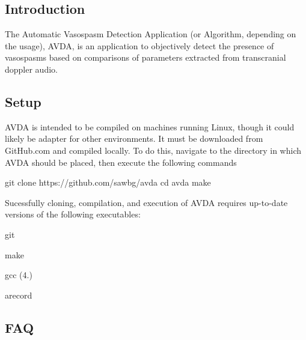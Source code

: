 \subsection*{Introduction}

The Automatic Vasospasm Detection Application (or Algorithm, depending on the usage), A\+V\+D\+A, is an application to objectively detect the presence of vasospasms based on comparisons of parameters extracted from transcranial doppler audio.

\subsection*{Setup}

A\+V\+D\+A is intended to be compiled on machines running Linux, though it could likely be adapter for other environments. It must be downloaded from Git\+Hub.\+com and compiled locally. To do this, navigate to the directory in which A\+V\+D\+A should be placed, then execute the following commands \begin{DoxyVerb}git clone https://github.com/sawbg/avda
cd avda
make
\end{DoxyVerb}


Sucessfully cloning, compilation, and execution of A\+V\+D\+A requires up-\/to-\/date versions of the following executables\+:


\begin{DoxyItemize}
\item git
\item make
\item gcc (4.)
\item arecord
\end{DoxyItemize}

\subsection*{F\+A\+Q}


